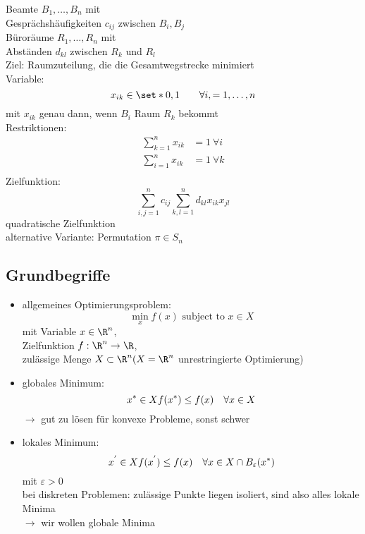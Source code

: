 \begin{beispiel}\enter
	Beamte $B_{1},\dots,B_{n}$ mit \\
	Gesprächshäufigkeiten $c_{ij}$ zwischen $B_{i},B_{j}$ \\
	Büroräume $R_{1}, \dots, R_{n}$ mit \\
	Abständen $d_{kl}$ zwischen $R_{k}$ und $R_{l}$ \\
	Ziel: Raumzuteilung, die die Gesamtwegstrecke minimiert\\
	Variable:
	\begin{equation*}
		x_{ik} \in \set*{0,1}\qquad \forall i,=1,\dots,n
	\end{equation*}
	mit $x_{ik}$ genau dann, wenn $B_{i}$ Raum $R_{k}$ bekommt\\
	Restriktionen:
	\begin{align*}
		\sum_{k=1}^{n} x_{ik} &=1 \ \forall i\\
		\sum_{i=1}^{n} x_{ik} &=1 \ \forall k\\
	\end{align*}
	Zielfunktion:
	\begin{equation*}
		\sum_{i,j=1}^{n} c_{ij}\sum_{k,l=1}^{n} d_{kl}x_{ik}x_{jl}
	\end{equation*}
	quadratische Zielfunktion \\
	alternative Variante: Permutation $\pi \in S_{n}$
\end{beispiel}

\subsection{Grundbegriffe}
\begin{itemize}
	\item allgemeines Optimierungsproblem:
		\begin{equation*}
			\min_{x} f(x) \text{ subject to } x\in X
		\end{equation*}
		mit Variable $x \in \R^n$,\\
		Zielfunktion $f:\R^n \to \R$,\\
		zulässige Menge $X \subset \R^n (X = \R^n$ unrestringierte Optimierung)
	\item globales Minimum:
		\begin{equation*}
			x^* \in X \mit f(x^*)\leq f(x)\quad \forall x \in X
		\end{equation*}
		$\to$ gut zu lösen für konvexe Probleme, sonst schwer
	\item lokales Minimum:
		\begin{equation*}
			x^{'} \in X \mit f(x^{'}) \leq f(x)\quad \forall x \in X \cap B_{\varepsilon}(x^*)
		\end{equation*}
		mit $\varepsilon > 0$\\
		bei diskreten Problemen: zulässige Punkte liegen isoliert, sind also alles lokale Minima\\
		$\to$  wir wollen globale Minima
\end{itemize}

